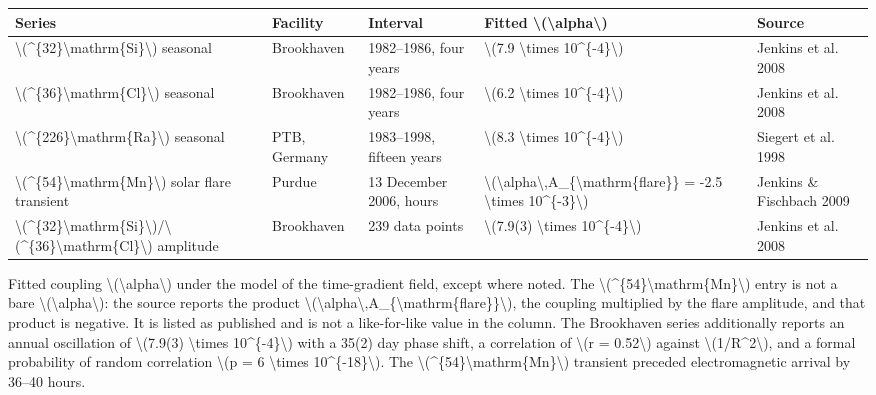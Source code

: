 \documentclass[
  10pt,
]{article}
\begin{document}
\begin{longtable}[]{@{}lllll@{}}
\toprule\noalign{}
Series & Facility & Interval & Fitted
\textbackslash(\textbackslash alpha\textbackslash) & Source \\
\midrule\noalign{}
\endhead
\bottomrule\noalign{}
\endlastfoot
\textbackslash(\^{}\{32\}\textbackslash mathrm\{Si\}\textbackslash)
seasonal & Brookhaven & 1982--1986, four years & \textbackslash(7.9
\textbackslash times 10\^{}\{-4\}\textbackslash) & Jenkins et al.
2008 \\
\textbackslash(\^{}\{36\}\textbackslash mathrm\{Cl\}\textbackslash)
seasonal & Brookhaven & 1982--1986, four years & \textbackslash(6.2
\textbackslash times 10\^{}\{-4\}\textbackslash) & Jenkins et al.
2008 \\
\textbackslash(\^{}\{226\}\textbackslash mathrm\{Ra\}\textbackslash)
seasonal & PTB, Germany & 1983--1998, fifteen years & \textbackslash(8.3
\textbackslash times 10\^{}\{-4\}\textbackslash) & Siegert et al.
1998 \\
\textbackslash(\^{}\{54\}\textbackslash mathrm\{Mn\}\textbackslash)
solar flare transient & Purdue & 13 December 2006, hours &
\textbackslash(\textbackslash alpha\textbackslash,A\_\{\textbackslash mathrm\{flare\}\}
= -2.5 \textbackslash times 10\^{}\{-3\}\textbackslash) & Jenkins \&
Fischbach 2009 \\
\textbackslash(\^{}\{32\}\textbackslash mathrm\{Si\}\textbackslash)/\textbackslash(\^{}\{36\}\textbackslash mathrm\{Cl\}\textbackslash)
amplitude & Brookhaven & 239 data points & \textbackslash(7.9(3)
\textbackslash times 10\^{}\{-4\}\textbackslash) & Jenkins et al.
2008 \\
\end{longtable}

Fitted coupling \textbackslash(\textbackslash alpha\textbackslash) under
the model of the time-gradient field, except where noted. The
\textbackslash(\^{}\{54\}\textbackslash mathrm\{Mn\}\textbackslash)
entry is not a bare \textbackslash(\textbackslash alpha\textbackslash):
the source reports the product
\textbackslash(\textbackslash alpha\textbackslash,A\_\{\textbackslash mathrm\{flare\}\}\textbackslash),
the coupling multiplied by the flare amplitude, and that product is
negative. It is listed as published and is not a like-for-like value in
the column. The Brookhaven series additionally reports an annual
oscillation of \textbackslash(7.9(3) \textbackslash times
10\^{}\{-4\}\textbackslash) with a 35(2) day phase shift, a correlation
of \textbackslash(r = 0.52\textbackslash) against
\textbackslash(1/R\^{}2\textbackslash), and a formal probability of
random correlation \textbackslash(p = 6 \textbackslash times
10\^{}\{-18\}\textbackslash). The
\textbackslash(\^{}\{54\}\textbackslash mathrm\{Mn\}\textbackslash)
transient preceded electromagnetic arrival by 36--40 hours.
\end{document}
